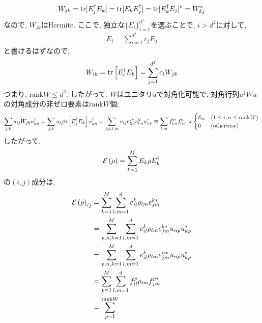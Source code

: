 \begin{ex}
    \label{ex8.10}
    \begin{align*}
        W_{jk} = \mathrm{tr}[ E_j^\dagger E_k] = \mathrm{tr}[ E_k E_j^\dagger] = \mathrm{tr}[ E_k^\dagger E_j]^*
        = W_{kj}^*
    \end{align*}
    なので, $W_{jk}$はHermite. ここで, 独立な$\{E_i\}_{i=1}^{d^2}$を選ぶことで, $i>d^2$に対して,
    \begin{align*}
        E_i = \sum_{i=1}^{d^2} c_j E_j
    \end{align*}
    と書けるはずなので,
    \begin{align*}
        W_{ik} = \mathrm{tr}\left[E_i^\dagger E_k\right] = \sum_{j=1}^{d^2} c_i W_{jk}
    \end{align*}
    つまり, $\mathrm{rank} W \leq d^2$. したがって, $W$はユニタリ$u$で対角化可能で, 対角行列$u^\dagger W u$の対角成分の非ゼロ要素は$\mathrm{rank}W$個;
    \begin{align*}
        \sum_{j,k} u_{ij} W_{jk} u^\dagger_{kn}
        =
        \sum_{j,k}
        u_{ij} \mathrm{tr}\left[ E_j^\dagger E_k\right] u^\dagger_{kn}
        =
        \sum_{j,k, l, m}
        u_{ij} e_{lm}^{j*} e_{lm}^k u_{nk}^*
        \equiv
        \sum_{l,m}
        f_{lm}^{i*} f_{lm}^{n}
        \propto
        \begin{cases}
            \delta_{in} & ( 1 \leq i, n \leq \mathrm{rank} W) \\
            0           & (\mathrm{otherwise})
        \end{cases}
    \end{align*}
    したがって,
    \begin{align*}
        \mathcal{E} \left( \rho \right)
        =
        \sum_{k=1}^M E_k \rho E_k^\dagger
    \end{align*}
    の$(i,j)$成分は,
    \begin{align*}
        \qo \left( \rho \right)_{ij}
         & =
        \sum_{k=1}^M
        \sum_{l,m = 1}^d e_{il}^k \rho_{lm} {e_{jm}^{k*}}                  \\
         & =
        \sum_{p,n, k=1}^M
        \sum_{l,m = 1}^d e_{il}^k \rho_{lm} {e_{jm}^{k*}}  u_{np} u_{kp}^* \\
         & =
        \sum_{p,n, k=1}^M
        \sum_{l,m = 1}^d e_{il}^k \rho_{lm} {e_{jm}^{n*}}  u_{np} u_{kp}^* \\
         & =
        \sum_{p=1}^{M}
        \sum_{l,m = 1}^d f_{il}^{p} \rho_{lm} f_{jm}^{p*}                  \\
         & =
        \sum_{p=1}^{\mathrm{rank}W}

\end{align*}
\end{ex}
